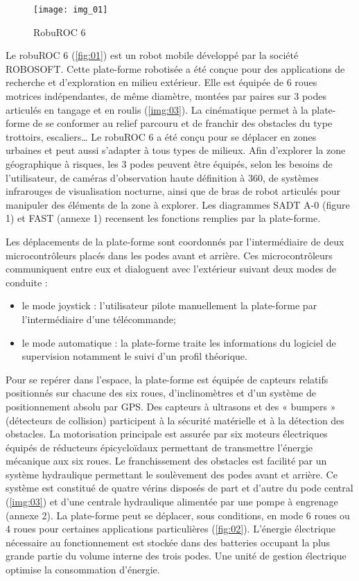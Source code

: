 \begin{wrapfigure}{r}{7cm}
\centering
\texttt{[image: img\_01]}
\caption{RobuROC 6 \label{fig:01}}
\end{wrapfigure}
Le robuROC 6 (\autoref{fig:01}) est un robot mobile développé par la société ROBOSOFT. Cette plate-forme robotisée a été conçue pour des applications de recherche et d’exploration en milieu extérieur. Elle est équipée de 6 roues motrices indépendantes, de même diamètre, montées par paires sur 3 podes articulés en tangage et en roulis (\autoref{img:03}). La cinématique permet à la plate-forme de se conformer au relief parcouru et de franchir des obstacles du type trottoirs, escaliers… Le robuROC 6 a été conçu pour se déplacer en zones urbaines et peut aussi s’adapter à tous types de milieux.  Afin d’explorer la zone géographique à risques, les 3 podes peuvent être équipés, selon les besoins de l’utilisateur, de caméras d’observation haute définition à 360\degres, de systèmes infrarouges de visualisation nocturne, ainsi que de bras de robot articulés pour manipuler des éléments de la zone à explorer. Les diagrammes SADT A-0 (figure 1) et FAST (annexe 1) recensent les fonctions remplies par la plate-forme.


Les déplacements de la plate-forme sont coordonnés par l’intermédiaire de deux microcontrôleurs placés dans les podes avant et arrière. Ces microcontrôleurs communiquent entre eux et dialoguent avec l’extérieur suivant deux modes de conduite : 
\begin{itemize}
\item le mode joystick : l’utilisateur pilote manuellement la plate-forme par l’intermédiaire d’une télécommande;
\item le mode automatique : la plate-forme traite les informations du logiciel de supervision notamment le suivi d’un profil théorique.
\end{itemize}

Pour se repérer dans l’espace, la plate-forme est équipée de capteurs relatifs positionnés sur chacune des six roues, d’inclinomètres et d’un système de positionnement absolu par GPS. Des capteurs à ultrasons et des « bumpers » (détecteurs de collision) participent à la sécurité matérielle et à la détection des obstacles.
La motorisation principale est assurée par six moteurs électriques équipés de réducteurs épicycloïdaux permettant de transmettre l’énergie mécanique aux six roues. Le franchissement des obstacles est facilité par un système hydraulique permettant le soulèvement des podes avant et arrière. Ce système est constitué de quatre vérins disposés de part et d’autre du pode central (\autoref{img:03}) et d’une centrale hydraulique alimentée par une pompe à engrenage (annexe 2). La plate-forme peut se déplacer, sous conditions, en mode 6 roues ou 4 roues pour certaines applications particulières (\autoref{fig:02}). L’énergie électrique nécessaire au fonctionnement est stockée dans des batteries occupant la plus grande partie du volume interne des trois podes. Une unité de gestion électrique optimise la consommation d’énergie. 

